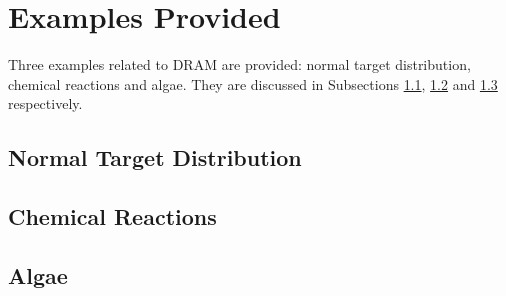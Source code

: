 \section{Examples Provided}\label{sc-dram-examples}

Three examples related to DRAM are provided: normal target distribution, chemical reactions and algae.
They are discussed in Subsections \ref{subsc-dram-normal-ex}, \ref{subsc-dram-himmel-ex} and \ref{subsc-dram-algae-ex} respectively.

\subsection{Normal Target Distribution}\label{subsc-dram-normal-ex}

\subsection{Chemical Reactions}\label{subsc-dram-himmel-ex}

\subsection{Algae}\label{subsc-dram-algae-ex}

